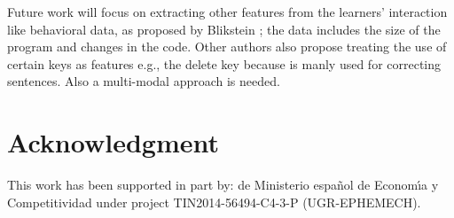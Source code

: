 \documentclass[a4paper]{llncs}
\begin{document}
Future work will focus on extracting other features from the learners'  interaction
like behavioral data, as proposed by Blikstein \cite{blikstein2011using} ; the data includes the size
of the program and changes in the code. Other authors also propose treating the use
of certain keys as features e.g., the delete key because is manly used for correcting
sentences. Also a multi-modal approach is needed. 

\section*{Acknowledgment} 
This work has been supported in part by: de Ministerio espa\~{n}ol de Econom\'{\i}a y Competitividad under project TIN2014-56494-C4-3-P (UGR-EPHEMECH).

 
 
\end{document}
